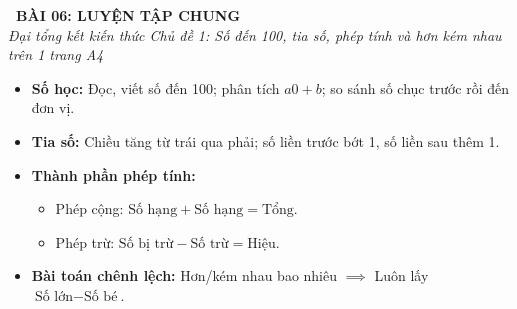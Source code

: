 \documentclass[11pt,a4paper]{article}
\begin{document}
\begin{tcolorbox}[
  enhanced,
  colback=violet!8!white,
  colframe=violet!70!black,
  arc=3mm, boxrule=1.2pt,
  left=3mm, right=3mm, top=2mm, bottom=2mm,
  halign=center
]
  {\LARGE\bfseries\color{violet!90!black}\faBookmark\ BÀI 06: LUYỆN TẬP CHUNG}\\[1mm]
  {\itshape\footnotesize\color{black!75} Đại tổng kết kiến thức Chủ đề 1: Số đến 100, tia số, phép tính và hơn kém nhau trên 1 trang A4}
\end{tcolorbox}

\vspace{-2mm}

\noindent
\begin{minipage}[t]{0.49\textwidth}\vspace{0pt}
\begin{tcolorbox}[
  enhanced,
  colback=violet!4!white,
  colframe=violet!75!black,
  arc=2mm, boxrule=0.8pt,
  left=2mm, right=2mm, top=1.8mm, bottom=1.8mm,
  title={\footnotesize\bfseries\color{white}\faKey\ 1. Trụ cột kiến thức cốt lõi}
]
{\footnotesize
\begin{itemize}\setlength{\itemsep}{1pt}\setlength{\leftskip}{-2.5mm}
  \item \textbf{Số học:} Đọc, viết số đến 100; phân tích $a0 + b$; so sánh số chục trước rồi đến đơn vị.
  \item \textbf{Tia số:} Chiều tăng từ trái qua phải; số liền trước bớt 1, số liền sau thêm 1.
  \item \textbf{Thành phần phép tính:}
  \begin{itemize}\setlength{\itemsep}{0.5pt}\setlength{\leftskip}{-2.5mm}
    \item Phép cộng: $\text{Số hạng} + \text{Số hạng} = \text{Tổng}$.
    \item Phép trừ: $\text{Số bị trừ} - \text{Số trừ} = \text{Hiệu}$.
  \end{itemize}
  \item \textbf{Bài toán chênh lệch:} Hơn/kém nhau bao nhiêu $\implies$ Luôn lấy $\text{Số lớn} - \text{Số bé}$.
\end{itemize}
}
\end{tcolorbox}
\end{minipage}
\hfill
\end{document}
